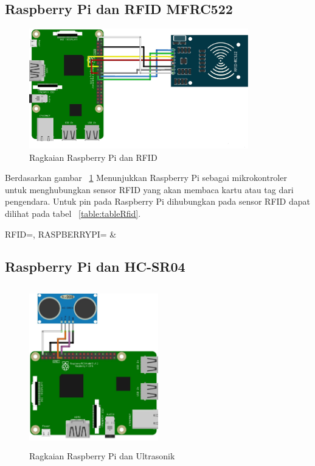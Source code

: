 \subsection{Raspberry Pi dan RFID MFRC522}
\begin{figure} [H]
    \includegraphics[width=0.85\textwidth, center]{images/skematik_rfid.jpg}
    \caption{Ragkaian Raspberry Pi dan RFID}
    \label{fig:skematikRfid}
\end{figure}

Berdasarkan gambar ~\ref{fig:skematikRfid} Menunjukkan Raspberry Pi sebagai mikrokontroler untuk menghubungkan sensor RFID yang akan membaca kartu atau tag dari pengendara. Untuk pin pada Raspberry Pi dihubungkan pada sensor RFID dapat dilihat pada tabel ~\ref{table:tableRfid}.

\begin{atable}
    \caption{Rangkaian pin RFID ke Raspberry Pi}
    \label{table:tableRfid}
        {
            RFID=\RFID, 
            RASPBERRYPI=\RASPBERRYPI}
        {
            \RFID & 
            \RASPBERRYPI}
\end{atable}

\subsection{Raspberry Pi dan HC-SR04}
\begin{figure} [H]
    \includegraphics[height=7cm, width=0.5\textwidth, center]{images/skematik_ultra.jpg}
    \caption{Ragkaian Raspberry Pi dan Ultrasonik}
    \label{fig:skematikUltrasonik}
\end{figure}

